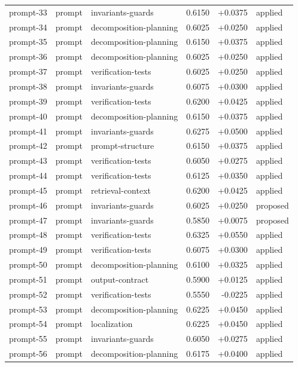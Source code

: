\begin{center}
\begin{longtable}{llp{5.2cm}rrl}
prompt-33 & prompt & invariants-guards & 0.6150 & +0.0375 & applied \\
prompt-34 & prompt & decomposition-planning & 0.6025 & +0.0250 & applied \\
prompt-35 & prompt & decomposition-planning & 0.6150 & +0.0375 & applied \\
prompt-36 & prompt & decomposition-planning & 0.6025 & +0.0250 & applied \\
prompt-37 & prompt & verification-tests & 0.6025 & +0.0250 & applied \\
prompt-38 & prompt & invariants-guards & 0.6075 & +0.0300 & applied \\
prompt-39 & prompt & verification-tests & 0.6200 & +0.0425 & applied \\
prompt-40 & prompt & decomposition-planning & 0.6150 & +0.0375 & applied \\
prompt-41 & prompt & invariants-guards & 0.6275 & +0.0500 & applied \\
prompt-42 & prompt & prompt-structure & 0.6150 & +0.0375 & applied \\
prompt-43 & prompt & verification-tests & 0.6050 & +0.0275 & applied \\
prompt-44 & prompt & verification-tests & 0.6125 & +0.0350 & applied \\
prompt-45 & prompt & retrieval-context & 0.6200 & +0.0425 & applied \\
prompt-46 & prompt & invariants-guards & 0.6025 & +0.0250 & proposed \\
prompt-47 & prompt & invariants-guards & 0.5850 & +0.0075 & proposed \\
prompt-48 & prompt & verification-tests & 0.6325 & +0.0550 & applied \\
prompt-49 & prompt & verification-tests & 0.6075 & +0.0300 & applied \\
prompt-50 & prompt & decomposition-planning & 0.6100 & +0.0325 & applied \\
prompt-51 & prompt & output-contract & 0.5900 & +0.0125 & applied \\
prompt-52 & prompt & verification-tests & 0.5550 & -0.0225 & applied \\
prompt-53 & prompt & decomposition-planning & 0.6225 & +0.0450 & applied \\
prompt-54 & prompt & localization & 0.6225 & +0.0450 & applied \\
prompt-55 & prompt & invariants-guards & 0.6050 & +0.0275 & applied \\
prompt-56 & prompt & decomposition-planning & 0.6175 & +0.0400 & applied \\

\end{longtable}
\end{center}
